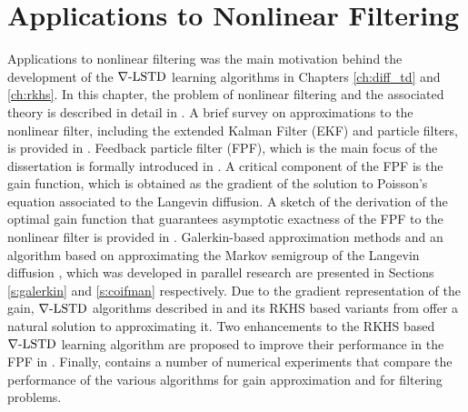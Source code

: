 \chapter{Applications to Nonlinear Filtering} 
\label{ch:filtering}
Applications to nonlinear filtering was the main motivation behind the development of the $\nabla\text{-LSTD}$ learning algorithms in Chapters \ref{ch:diff_td} and \ref{ch:rkhs}. In this chapter, the problem of nonlinear filtering and the associated theory is described in detail in . A brief survey on approximations to the nonlinear filter, including the extended Kalman Filter (EKF) and particle filters, is provided in . Feedback particle filter (FPF), which is the main focus of the dissertation is formally introduced in . A critical component of the FPF is the gain function, which is obtained as the gradient of the solution to Poisson's equation associated to the Langevin diffusion. A sketch of the derivation of the optimal gain function that guarantees asymptotic exactness of the FPF to the nonlinear filter is provided in .  Galerkin-based approximation methods and an algorithm based on approximating the Markov semigroup of the Langevin diffusion \cite{tagmeh16a}, which was developed in parallel research are presented in Sections \ref{s:galerkin} and \ref{s:coifman} respectively. Due to the gradient representation of the gain, $\nabla\text{-LSTD}$ algorithms described in  and its RKHS based variants from  offer a natural solution to approximating it. Two enhancements to the RKHS based $\nabla\text{-LSTD}$ learning algorithm are proposed to improve their performance in the FPF in . Finally,  contains a number of numerical experiments that compare the performance of the various algorithms for gain approximation and for filtering problems.  

